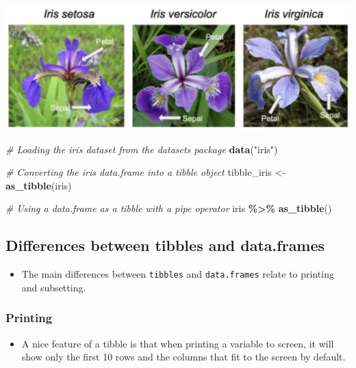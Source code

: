 \documentclass[
]{book}
\newenvironment{Shaded}{\begin{snugshade}}{\end{snugshade}}
\newcommand{\CommentTok}[1]{\textcolor[rgb]{0.56,0.35,0.01}{\textit{#1}}}
\newcommand{\FunctionTok}[1]{\textcolor[rgb]{0.13,0.29,0.53}{\textbf{#1}}}
\newcommand{\NormalTok}[1]{#1}
\newcommand{\OtherTok}[1]{\textcolor[rgb]{0.56,0.35,0.01}{#1}}
\newcommand{\SpecialCharTok}[1]{\textcolor[rgb]{0.81,0.36,0.00}{\textbf{#1}}}
\newcommand{\StringTok}[1]{\textcolor[rgb]{0.31,0.60,0.02}{#1}}
\providecommand{\tightlist}{%
  \setlength{\itemsep}{0pt}\setlength{\parskip}{0pt}}
\begin{document}
\includegraphics{./img/iris_data.png}

\begin{Shaded}
\begin{Highlighting}[]
\CommentTok{\# Loading the iris dataset from the datasets package}
\FunctionTok{data}\NormalTok{(}\StringTok{"iris"}\NormalTok{)}

\CommentTok{\# Converting the iris data.frame into a tibble object}
\NormalTok{tibble\_iris }\OtherTok{\textless{}{-}} \FunctionTok{as\_tibble}\NormalTok{(iris)}

\CommentTok{\# Using a data.frame as a tibble with a pipe operator}
\NormalTok{iris }\SpecialCharTok{\%\textgreater{}\%} \FunctionTok{as\_tibble}\NormalTok{()}
\end{Highlighting}
\end{Shaded}

\subsection{Differences between tibbles and data.frames}\label{differences-between-tibbles-and-data.frames}

\begin{itemize}
\tightlist
\item
  The main differences between \texttt{tibbles} and \texttt{data.frames} relate to printing and subsetting.
\end{itemize}

\subsubsection{Printing}\label{printing}

\begin{itemize}
\tightlist
\item
  A nice feature of a tibble is that when printing a variable to screen, it will show only the first 10 rows and the columns that fit to the screen by default.
\end{itemize}
\end{document}
